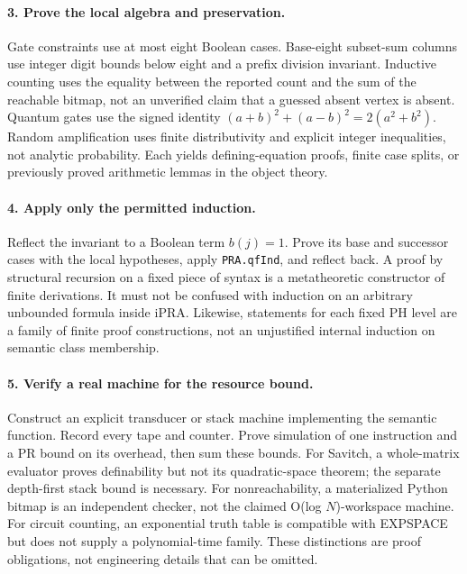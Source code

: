\paragraph{3. Prove the local algebra and preservation.}
Gate constraints use at most eight Boolean cases. Base-eight subset-sum columns use integer digit bounds below eight and a prefix division invariant. Inductive counting uses the equality between the reported count and the sum of the reachable bitmap, not an unverified claim that a guessed absent vertex is absent. Quantum gates use the signed identity $(a+b)^2+(a-b)^2=2(a^2+b^2)$. Random amplification uses finite distributivity and explicit integer inequalities, not analytic probability. Each yields defining-equation proofs, finite case splits, or previously proved arithmetic lemmas in the object theory.

\paragraph{4. Apply only the permitted induction.}
Reflect the invariant to a Boolean term $b(j)=1$. Prove its base and successor cases with the local hypotheses, apply \texttt{PRA.qfInd}, and reflect back. A proof by structural recursion on a fixed piece of syntax is a metatheoretic constructor of finite derivations. It must not be confused with induction on an arbitrary unbounded formula inside iPRA. Likewise, statements for each fixed PH level are a family of finite proof constructions, not an unjustified internal induction on semantic class membership.

\paragraph{5. Verify a real machine for the resource bound.}
Construct an explicit transducer or stack machine implementing the semantic function. Record every tape and counter. Prove simulation of one instruction and a PR bound on its overhead, then sum these bounds. For Savitch, a whole-matrix evaluator proves definability but not its quadratic-space theorem; the separate depth-first stack bound is necessary. For nonreachability, a materialized Python bitmap is an independent checker, not the claimed O(log $N$)-workspace machine. For circuit counting, an exponential truth table is compatible with EXPSPACE but does not supply a polynomial-time family. These distinctions are proof obligations, not engineering details that can be omitted.

